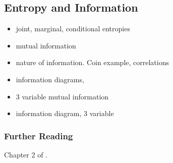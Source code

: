 \documentclass[Lectures.tex]{subfiles}
\begin{document}

\subsection{Entropy and Information}

\begin{itemize}
\item joint, marginal, conditional entropies
\item mutual information 
\item nature of information. Coin example, correlations 
\item information diagrams, 
\item 3 variable mutual information
\item information diagram, 3 variable
\end{itemize}

\subsubsection*{Further Reading}
 Chapter 2 of .
\end{document}

